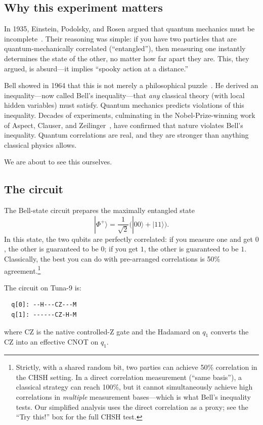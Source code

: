 \documentclass[amsmath,amssymb,reprint,aps,prb]{revtex4-2}
\newcommand{\ket}[1]{|#1\rangle}
\begin{document}
\subsection{Why this experiment matters}

In 1935, Einstein, Podolsky, and Rosen argued that quantum mechanics
must be incomplete~\cite{EPR1935}.  Their reasoning was simple: if
you have two particles that are quantum-mechanically correlated
(``entangled''), then measuring one instantly determines the state of
the other, no matter how far apart they are.  This, they argued, is
absurd---it implies ``spooky action at a distance.''

Bell showed in 1964 that this is not merely a philosophical
puzzle~\cite{Bell1964}.  He derived an inequality---now called
Bell's inequality---that \emph{any} classical theory (with local
hidden variables) must satisfy.  Quantum mechanics predicts
violations of this inequality.  Decades of experiments, culminating
in the Nobel-Prize-winning work of Aspect, Clauser, and
Zeilinger~\cite{Nobel2022}, have confirmed that nature violates
Bell's inequality.  Quantum correlations are real, and they are
stronger than anything classical physics allows.

We are about to see this ourselves.

\subsection{The circuit}

The Bell-state circuit prepares the maximally entangled state
\begin{equation}\label{eq:bell}
\ket{\Phi^+} = \frac{1}{\sqrt{2}}\bigl(\ket{00} + \ket{11}\bigr).
\end{equation}
In this state, the two qubits are perfectly correlated: if you
measure one and get $0$, the other is guaranteed to be $0$; if you
get $1$, the other is guaranteed to be $1$.  Classically, the best
you can do with pre-arranged correlations is 50\%
agreement.\footnote{Strictly, with a shared random bit, two parties
can achieve 50\% correlation in the CHSH setting.  In a direct
correlation measurement (``same basis''), a classical strategy can
reach 100\%, but it cannot simultaneously achieve high correlations
in \emph{multiple} measurement bases---which is what Bell's
inequality tests.  Our simplified analysis uses the direct
correlation as a proxy; see the ``Try this!'' box for the full CHSH
test.}

The circuit on Tuna-9 is:
\begin{verbatim}
  q[0]: --H---CZ---M
  q[1]: ------CZ-H-M
\end{verbatim}
where CZ is the native controlled-Z gate and the Hadamard on
$q_1$ converts the CZ into an effective CNOT on $q_1$.
\end{document}
